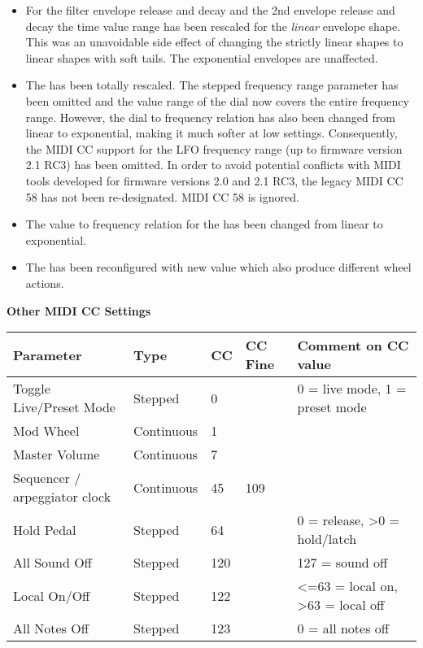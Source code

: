 \begin{itemize}
  \item For the filter envelope release and decay and the 2nd envelope release and decay the time value range has been rescaled for the \textit{linear} envelope shape. This was an unavoidable side effect of changing the strictly linear shapes to linear shapes with soft tails. The exponential envelopes are unaffected.
  \item The \lfofreq has been totally rescaled. The stepped frequency range parameter has been omitted and the value range of the \lfofreq dial now covers the entire frequency range. However, the dial to frequency relation has also been changed from linear to exponential, making it much softer at low settings. Consequently, the MIDI CC support for the LFO frequency range (up to firmware version 2.1 RC3) has been omitted. In order to avoid potential conflicts with MIDI tools developed for firmware versions 2.0 and 2.1 RC3, the legacy MIDI CC 58 has not been re-designated. MIDI CC 58 is ignored.
  \item The value to frequency relation for the \vibspeed has been changed from linear to exponential.   
  \item The \modwheelrange has been reconfigured with new value which also produce different wheel actions.
\end{itemize}

\textbf{Other MIDI CC Settings}

\footnotesize
\renewcommand{\arraystretch}{1.3}


\begin{longtable}[l]{ p{6cm}|p{2.5cm}|p{1.5cm}|p{2cm}|p{7cm}} 
\textbf{Parameter} & \textbf{Type} & \textbf{CC} & \textbf{CC Fine} & \textbf{Comment on CC value} \\ \hline
Toggle Live/Preset Mode & Stepped & 0 & & 0 = live mode, 1 = preset mode \\ \hline
Mod Wheel & Continuous & 1 & & \\ \hline
Master Volume & Continuous & 7 & & \\ \hline
Sequencer / arpeggiator clock & Continuous & 45 & 109 & \\ \hline
Hold Pedal & Stepped & 64 & & 0 = release, >0 = hold/latch\\ \hline
All Sound Off & Stepped & 120 & & 127 = sound off\\ \hline
Local On/Off & Stepped & 122 & & <=63 = local on, >63 = local off \\ \hline
All Notes Off & Stepped & 123 & & 0 = all notes off\\ \hline
\end{longtable}


\normalsize
